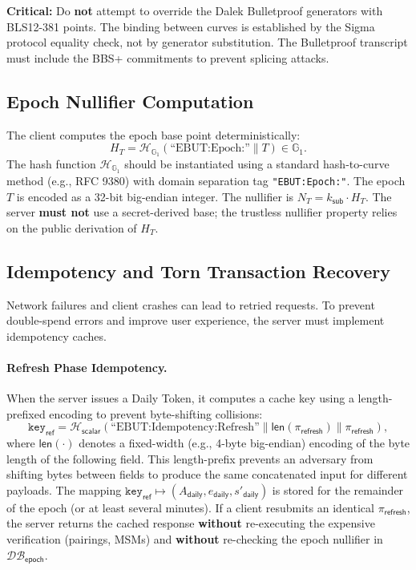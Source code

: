 \documentclass[11pt]{article}
\theoremstyle{definitionstyle}
\theoremstyle{plain}
\newcommand{\DB}{\mathcal{DB}}
\begin{document}
\textbf{Critical:} Do \textbf{not} attempt to override the Dalek Bulletproof generators with BLS12-381 points. The binding between curves is established by the Sigma protocol equality check, not by generator substitution. The Bulletproof transcript must include the BBS+ commitments to prevent splicing attacks.

\subsection{Epoch Nullifier Computation}

The client computes the epoch base point deterministically:
\[
H_T = \mathcal{H}_{\mathbb{G}_1}(\text{``EBUT:Epoch:''} \parallel T) \in \mathbb{G}_1.
\]
The hash function $\mathcal{H}_{\mathbb{G}_1}$ should be instantiated using a standard hash-to-curve method (e.g., RFC 9380) with domain separation tag \texttt{"EBUT:Epoch:"}. The epoch $T$ is encoded as a 32-bit big-endian integer. The nullifier is $N_T = k_{\mathsf{sub}} \cdot H_T$. The server \textbf{must not} use a secret-derived base; the trustless nullifier property relies on the public derivation of $H_T$.

\subsection{Idempotency and Torn Transaction Recovery}

Network failures and client crashes can lead to retried requests. To prevent double-spend errors and improve user experience, the server must implement idempotency caches.

\paragraph{Refresh Phase Idempotency.}
When the server issues a Daily Token, it computes a cache key using a length-prefixed encoding to prevent byte-shifting collisions:
\[
\mathtt{key}_{\mathsf{ref}} = \mathcal{H}_{\mathsf{scalar}}\!\left(\text{``EBUT:Idempotency:Refresh''} \parallel \mathsf{len}(\pi_{\mathsf{refresh}}) \parallel \pi_{\mathsf{refresh}} \right),
\]
where $\mathsf{len}(\cdot)$ denotes a fixed-width (e.g., 4-byte big-endian) encoding of the byte length of the following field. This length-prefix prevents an adversary from shifting bytes between fields to produce the same concatenated input for different payloads.
The mapping $\mathtt{key}_{\mathsf{ref}} \mapsto (A_{\mathsf{daily}}, e_{\mathsf{daily}}, s'_{\mathsf{daily}})$ is stored for the remainder of the epoch (or at least several minutes). If a client resubmits an identical $\pi_{\mathsf{refresh}}$, the server returns the cached response \textbf{without} re-executing the expensive verification (pairings, MSMs) and \textbf{without} re-checking the epoch nullifier in $\DB_{\mathsf{epoch}}$.
\end{document}
